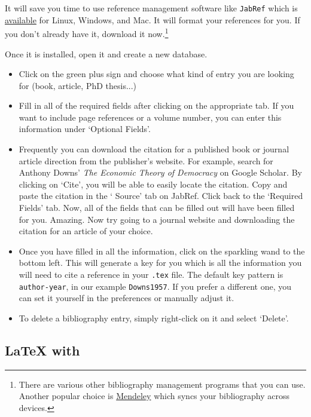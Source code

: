 It will save you time to use reference management software like \texttt{JabRef} which is \href{http://www.jabref.org/}{available} for Linux, Windows, and Mac. It will format your references for you. If you don't already have it, download it now.\footnote{There are various other bibliography management programs that you can use. Another popular choice is \href{https://www.mendeley.com/}{Mendeley} which syncs your bibliography across devices.}

Once it is installed, open it and create a new database.
\begin{itemize}
\item Click on the green plus sign and choose what kind of entry you are looking for (book, article, PhD thesis...)

\item Fill in all of the required fields after clicking on the appropriate tab. If you want to include page references or a volume number, you can enter this information under `Optional Fields'.

\item Frequently you can download the  citation for a published book or journal article direction from the publisher's website. For example, search for Anthony Downs' \textit{The Economic Theory of Democracy} on Google Scholar. By clicking on `Cite', you will be able to easily locate the  citation. Copy and paste the citation in the ` Source' tab on JabRef. Click back to the `Required Fields' tab. Now, all of the fields that can be filled out will have been filled for you. Amazing. Now try going to a journal website and downloading the citation for an article of your choice.

\item Once you have filled in all the information, click on the sparkling wand to the bottom left. This will generate a  key for you which is all the information you will need to cite a reference in your \texttt{.tex} file. The default key pattern is \texttt{author-year}, in our example \texttt{Downs1957}. If you prefer a different one, you can set it yourself in the preferences or manually adjust it.

\item To delete a bibliography entry, simply right-click on it and select `Delete'.
\end{itemize}


\subsection{\LaTeX{} with }

